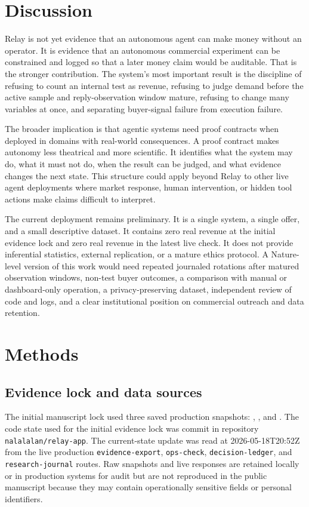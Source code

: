 \documentclass[12pt,letterpaper]{article}
\begin{document}
\section{Discussion}

Relay is not yet evidence that an autonomous agent can make money without an operator. It is evidence that an autonomous commercial experiment can be constrained and logged so that a later money claim would be auditable. That is the stronger contribution. The system's most important result is the discipline of refusing to count an internal test as revenue, refusing to judge demand before the active sample and reply-observation window mature, refusing to change many variables at once, and separating buyer-signal failure from execution failure.

The broader implication is that agentic systems need proof contracts when deployed in domains with real-world consequences. A proof contract makes autonomy less theatrical and more scientific. It identifies what the system may do, what it must not do, when the result can be judged, and what evidence changes the next state. This structure could apply beyond Relay to other live agent deployments where market response, human intervention, or hidden tool actions make claims difficult to interpret.

The current deployment remains preliminary. It is a single system, a single offer, and a small descriptive dataset. It contains zero real revenue at the initial evidence lock and zero real revenue in the latest live check. It does not provide inferential statistics, external replication, or a mature ethics protocol. A Nature-level version of this work would need repeated journaled rotations after matured observation windows, non-test buyer outcomes, a comparison with manual or dashboard-only operation, a privacy-preserving dataset, independent review of code and logs, and a clear institutional position on commercial outreach and data retention.

\section{Methods}

\subsection{Evidence lock and data sources}

The initial manuscript lock used three saved production snapshots: \texttt{}, \texttt{}, and \texttt{}. The code state used for the initial evidence lock was commit \texttt{} in repository \texttt{nalalalan/relay-app}. The current-state update was read at 2026-05-18T20:52Z from the live production \texttt{evidence-export}, \texttt{ops-check}, \texttt{decision-ledger}, and \texttt{research-journal} routes. Raw snapshots and live responses are retained locally or in production systems for audit but are not reproduced in the public manuscript because they may contain operationally sensitive fields or personal identifiers.
\end{document}

